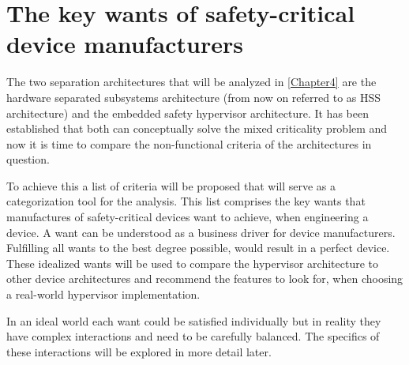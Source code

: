
\chapter{The key wants of safety-critical device manufacturers} %

\label{Chapter3} %


\newcommand{\keyword}[1]{\textbf{#1}}
\newcommand{\tabhead}[1]{\textbf{#1}}
\newcommand{\code}[1]{\texttt{#1}}
\newcommand{\file}[1]{\texttt{\bfseries#1}}
\newcommand{\option}[1]{\texttt{\itshape#1}}


The two separation architectures that will be analyzed in \ref{Chapter4} are the hardware separated subsystems architecture (from now on referred to as \gls{HSS} architecture) and the embedded safety hypervisor architecture. It has been established that both can conceptually solve the mixed criticality problem and now it is time to compare the non-functional criteria of the architectures in question. 

To achieve this a list of criteria will be proposed that will serve as a categorization tool for the analysis.
This list comprises the key wants that manufactures of safety-critical devices want to achieve, when engineering a device. A want can be understood as a business driver for device manufacturers. Fulfilling all wants to the best degree possible, would result in a perfect device. These idealized wants will be used to compare the hypervisor architecture to other device architectures and recommend the features to look for, when choosing a real-world hypervisor implementation.

In an ideal world each want could be satisfied individually but in reality they have complex interactions and need to be carefully balanced. The specifics of these interactions will be explored in more detail later.


